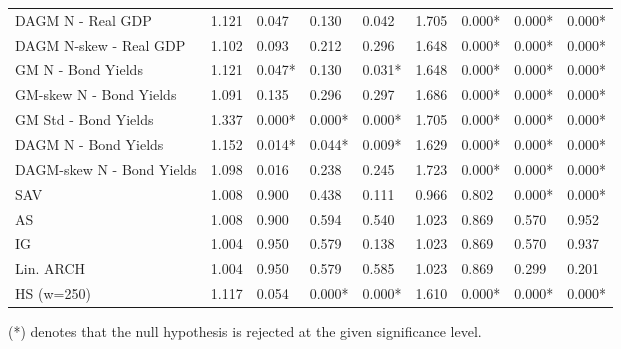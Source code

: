 \documentclass{article}
\begin{document}
\begin{table}[ht]
\begin{tabular}{|l|llll|llll|}
  DAGM N - Real GDP & 1.121 & 0.047 & 0.130 & 0.042 & 1.705 & 0.000* & 0.000* & 0.000*\\ 
  DAGM N-skew - Real GDP & 1.102 & 0.093 & 0.212 & 0.296 & 1.648 & 0.000* & 0.000* & 0.000*\\ 
  GM N - Bond Yields & 1.121 & 0.047* & 0.130 & 0.031* & 1.648 & 0.000* & 0.000* & 0.000*\\ 
  GM-skew N - Bond Yields & 1.091 & 0.135 & 0.296 & 0.297 & 1.686 & 0.000* & 0.000* & 0.000*\\ 
  GM Std - Bond Yields & 1.337 & 0.000* & 0.000* & 0.000* & 1.705 & 0.000* & 0.000* & 0.000*\\ 
  DAGM N - Bond Yields & 1.152 & 0.014* & 0.044* & 0.009* & 1.629 & 0.000* & 0.000* & 0.000*\\ 
  DAGM-skew N - Bond Yields & 1.098 & 0.016 & 0.238 & 0.245 & 1.723 & 0.000* & 0.000* & 0.000*\\ 
  \hline
  SAV & 1.008 & 0.900 & 0.438 & 0.111 & 0.966 & 0.802 & 0.000* & 0.000* \\ 
  AS & 1.008 & 0.900 & 0.594 & 0.540 & 1.023 & 0.869 & 0.570 & 0.952 \\ 
  IG & 1.004 & 0.950 & 0.579 & 0.138 & 1.023 & 0.869 & 0.570 & 0.937\\ 
  Lin. ARCH & 1.004 & 0.950 & 0.579 & 0.585 & 1.023 & 0.869 & 0.299 & 0.201\\ 
  \hline
  HS (w=250) & 1.117 & 0.054 & 0.000* & 0.000* & 1.610 & 0.000*  & 0.000* & 0.000* \\ 
   \hline
\end{tabular}
\end{table}
(*) denotes that the null hypothesis is rejected at the given significance level.
\end{document}
